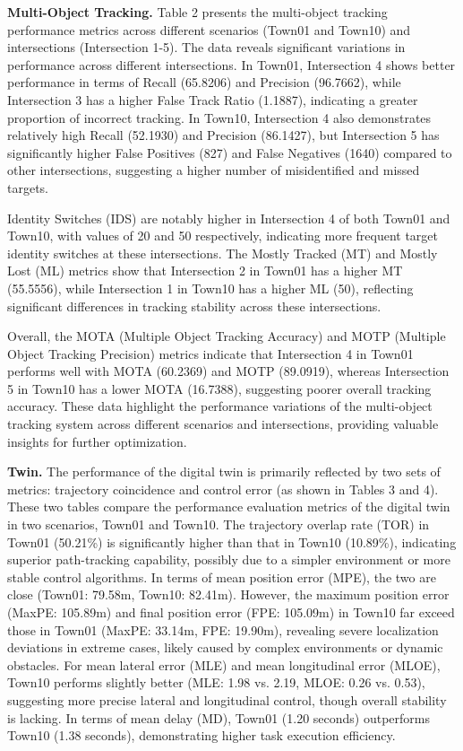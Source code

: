 \documentclass[lettersize,journal]{IEEEtran}
\begin{document}
\textbf{Multi-Object Tracking.}
Table 2 presents the multi-object tracking performance metrics across different scenarios (Town01 and Town10) and intersections (Intersection 1-5). 
The data reveals significant variations in performance across different intersections. 
In Town01, Intersection 4 shows better performance in terms of Recall (65.8206) and Precision (96.7662), while Intersection 3 has a higher False Track Ratio (1.1887), indicating a greater proportion of incorrect tracking. 
In Town10, Intersection 4 also demonstrates relatively high Recall (52.1930) and Precision (86.1427), but Intersection 5 has significantly higher False Positives (827) and False Negatives (1640) compared to other intersections, suggesting a higher number of misidentified and missed targets.

Identity Switches (IDS) are notably higher in Intersection 4 of both Town01 and Town10, with values of 20 and 50 respectively, indicating more frequent target identity switches at these intersections. 
The Mostly Tracked (MT) and Mostly Lost (ML) metrics show that Intersection 2 in Town01 has a higher MT (55.5556), while Intersection 1 in Town10 has a higher ML (50), reflecting significant differences in tracking stability across these intersections.

Overall, the MOTA (Multiple Object Tracking Accuracy) and MOTP (Multiple Object Tracking Precision) metrics indicate that Intersection 4 in Town01 performs well with MOTA (60.2369) and MOTP (89.0919), whereas Intersection 5 in Town10 has a lower MOTA (16.7388), suggesting poorer overall tracking accuracy. 
These data highlight the performance variations of the multi-object tracking system across different scenarios and intersections, providing valuable insights for further optimization.

\textbf{Twin.}
The performance of the digital twin is primarily reflected by two sets of metrics: trajectory coincidence and control error (as shown in Tables 3 and 4). 
These two tables compare the performance evaluation metrics of the digital twin in two scenarios, Town01 and Town10. 
The trajectory overlap rate (TOR) in Town01 (50.21\%) is significantly higher than that in Town10 (10.89\%), indicating superior path-tracking capability, possibly due to a simpler environment or more stable control algorithms. 
In terms of mean position error (MPE), the two are close (Town01: 79.58m, Town10: 82.41m). 
However, the maximum position error (MaxPE: 105.89m) and final position error (FPE: 105.09m) in Town10 far exceed those in Town01 (MaxPE: 33.14m, FPE: 19.90m), revealing severe localization deviations in extreme cases, likely caused by complex environments or dynamic obstacles. 
For mean lateral error (MLE) and mean longitudinal error (MLOE), Town10 performs slightly better (MLE: 1.98 vs. 2.19, MLOE: 0.26 vs. 0.53), suggesting more precise lateral and longitudinal control, though overall stability is lacking. 
In terms of mean delay (MD), Town01 (1.20 seconds) outperforms Town10 (1.38 seconds), demonstrating higher task execution efficiency.
\end{document}
